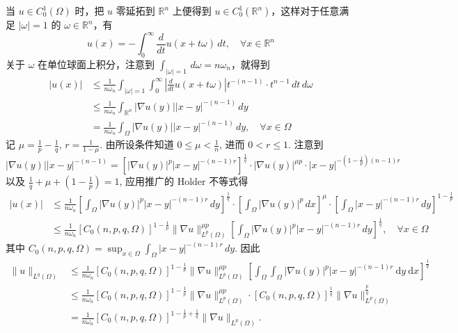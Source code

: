 当 $u\in C^{1}_{0}(\Omega)$ 时，把 $u$ 零延拓到 $\mathbb{R}^{n}$ 上便得到 $u\in C_0^{1}(\mathbb{R}^{n})$，这样对于任意满足 $\lvert \omega \rvert=1$ 的 $\omega\in \mathbb{R}^{n}$，有
\[
u(x)=-\int_{0}^{\infty} \frac{d}{dt}u(x+t\omega) \, dt, \quad \forall x\in \mathbb{R}^{n}
\]
关于 $\omega$ 在单位球面上积分，注意到 $\displaystyle\int_{\lvert \omega \rvert=1}^{}  \, d\omega=n\omega _n$，就得到
\[
\begin{aligned}
\lvert u(x)  \rvert  & \leq \frac{1}{n\omega _n}\int_{\lvert \omega \rvert =1}^{} \int_{0}^{\infty} \left\lvert  \frac{d}{dt} u(x+t\omega)  \right\rvert t^{-(n-1)}\cdot t^{n-1} \, dt  \, d\omega \\
 & \leq \frac{1}{n\omega _n }\int_{\mathbb{R}^{n}}^{} \lvert \nabla u(y) \rvert \lvert x-y \rvert ^{-(n-1)} \, dy \\
  & =\frac{1}{n\omega _n } \int_{\Omega}^{} \lvert \nabla u(y) \rvert \lvert x-y \rvert ^{-(n-1)} \, dy,\quad \forall x\in \Omega   
\end{aligned}
\]
记 $\mu=\frac{1}{p}-\frac{1}{q}$, $r=\frac{1}{1-\mu}$. 由所设条件知道 $0\leq \mu<\frac{1}{n}$, 进而 $0<r\leq1$. 注意到
\[
\lvert \nabla u(y) \rvert \lvert x-y \rvert ^{-(n-1)}=[\lvert \nabla u(y) \rvert ^{p}\lvert x-y \rvert ^{-(n-1)r}]^{\frac{1}{q}}\cdot \lvert \nabla u(y) \rvert ^{\mu p}\cdot \lvert x-y \rvert ^{-\left( 1-\frac{1}{p} \right)(n-1)r}
\]
以及 $\frac{1}{q}+\mu+\left( 1-\frac{1}{p} \right)=1$, 应用推广的 Holder 不等式得
\[
\begin{aligned}
\lvert u(x) \rvert  & \leq \frac{1}{n\omega _n }\left[ \int_{\Omega}^{} \lvert \nabla u(y) \rvert ^{p}\lvert x-y \rvert ^{-(n-1)r} \, dy  \right]^{\frac{1}{q}}\cdot \left[ \int_{\Omega}^{} \lvert \nabla u(y) \rvert ^{p} \, dx  \right]^{\mu}\cdot\left[ \int_{\Omega}^{} \lvert x-y \rvert ^{-(n-1)r} \, dy  \right]^{1-\frac{1}{p}}  \\
 & \leq \frac{1}{n\omega _n } [C_0(n,p,q,\Omega)]^{1-\frac{1}{p}}\lVert \nabla u \rVert ^{\mu p}_{L^{p}(\Omega)}\left[ \int_{\Omega}^{} \lvert \nabla u(y) \rvert ^{p}\lvert x-y \rvert ^{-(n-1)r} \, dy  \right]^{\frac{1}{q}},\quad \forall x\in \Omega   
\end{aligned}
\]
其中 $\displaystyle C_0(n,p,q,\Omega)=\sup_{x\in \Omega}\int_{\Omega}^{} \lvert x-y \rvert ^{-(n-1)r} \, dy$. 因此
\[
\begin{aligned}
\|u\|_{L^q(\Omega)} & \leqslant \frac{1}{n \omega_n}\left[C_0(n, p, q, \Omega)\right]^{1-\frac{1}{p}}\|\nabla u\|_{L^p(\Omega)}^{\mu p}\left[\int_{\Omega} \int_{\Omega}|\nabla u(y)|^p|x-y|^{-(n-1) r} \mathrm{~d} y \mathrm{~d} x\right]^{\frac{1}{q}} \\
& \leqslant \frac{1}{n \omega_n}\left[C_0(n, p, q, \Omega)\right]^{1-\frac{1}{p}}\|\nabla u\|_{L^p(\Omega)}^{\mu p} \cdot\left[C_0(n, p, q, \Omega)\right]^{\frac{1}{q}}\|\nabla u\|_{L^p(\Omega)}^{\frac{p}{q}} \\
& =\frac{1}{n \omega_n}\left[C_0(n, p, q, \Omega)\right]^{1-\frac{1}{p}+\frac{1}{q}}\|\nabla u\|_{L^p(\Omega)} .
\end{aligned}
\]
